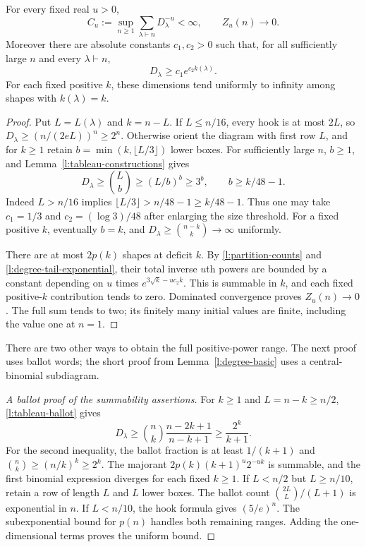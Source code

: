 \begin{theorem}\label{l:degree-all-powers}
For every fixed real $u>0$,
\begin{equation}\label{l:degree-all-powers-equation}
 C_u:=\sup_{n\ge1}\sum_{\lambda\vdash n}D_\lambda^{-u}<\infty,
 \qquad Z_u(n)\longrightarrow0.
\end{equation}
Moreover there are absolute constants $c_1,c_2>0$ such that, for all
sufficiently large $n$ and every $\lambda\vdash n$,
\begin{equation}\label{l:degree-tail-exponential}
 D_\lambda\ge c_1e^{c_2k(\lambda)}.
\end{equation}
For each fixed positive $k$, these dimensions tend uniformly to infinity
among shapes with $k(\lambda)=k$.
\end{theorem}
\begin{proof}
Put $L=L(\lambda)$ and $k=n-L$.  If $L\le n/16$, every hook is at
most $2L$, so
$D_\lambda\ge(n/(2eL))^n\ge2^n$.
Otherwise orient the diagram with first row $L$, and for $k\ge1$
retain $b=\min(k,\lfloor L/3\rfloor)$ lower boxes.  For sufficiently
large $n$, $b\ge1$, and Lemma~\ref{l:tableau-constructions} gives
\[
 D_\lambda\ge\binom Lb\ge(L/b)^b\ge3^b,
 \qquad b\ge k/48-1.
\]
Indeed $L>n/16$ implies $\lfloor L/3\rfloor>n/48-1\ge k/48-1$.
Thus one may take $c_1=1/3$ and $c_2=(\log3)/48$ after enlarging
the size threshold.  For a fixed positive $k$, eventually $b=k$,
and $D_\lambda\ge\binom{n-k}{k}\to\infty$ uniformly.

There are at most $2p(k)$ shapes at deficit $k$.  By
\eqref{l:partition-counts} and \eqref{l:degree-tail-exponential}, their
total inverse $u$th powers are bounded by a constant depending on $u$
times $e^{3\sqrt k-uc_2k}$.  This is summable in $k$, and each fixed
positive-$k$ contribution tends to zero.  Dominated convergence proves
$Z_u(n)\to0$.  The full sum tends to two; its finitely many initial
values are finite, including the value one at $n=1$.
\end{proof}

There are two other ways to obtain the full positive-power range.
The next proof uses ballot words; the short proof from
Lemma~\ref{l:degree-basic} uses a central-binomial subdiagram.

\begin{proof}[A ballot proof of the summability assertions]
For $k\ge1$ and $L=n-k\ge n/2$, \eqref{l:tableau-ballot} gives
\[
 D_\lambda\ge\binom nk\frac{n-2k+1}{n-k+1}
       \ge\frac{2^k}{k+1}.
\]
For the second inequality, the ballot fraction is at least $1/(k+1)$
and $\binom nk\ge(n/k)^k\ge2^k$.
The majorant $2p(k)(k+1)^u2^{-uk}$ is summable, and the first
binomial expression diverges for each fixed $k\ge1$.
If $L<n/2$ but $L\ge n/10$, retain a row of length $L$ and $L$
lower boxes.  The ballot count $\binom{2L}L/(L+1)$ is exponential
in $n$.  If $L<n/10$, the hook formula gives $(5/e)^n$.
The subexponential bound for $p(n)$ handles both remaining ranges.
Adding the one-dimensional terms proves the uniform bound.
\end{proof}

